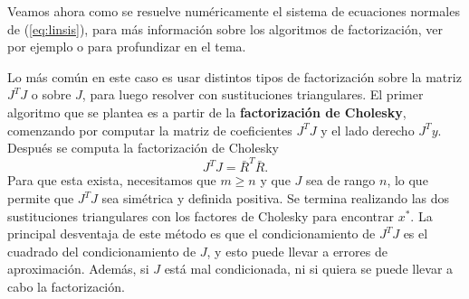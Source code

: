 \documentclass[11pt,a4paper]{book}
\theoremstyle{definition}
\theoremstyle{remark}
\begin{document}
Veamos ahora como se resuelve numéricamente el sistema de ecuaciones normales de (\ref{eq:linsis}), para más información sobre los algoritmos de factorización, ver por ejemplo \cite{Trefethen1997-ek} o \cite{Golub2013-li} para profundizar en el tema.

Lo más común en este caso es usar distintos tipos de factorización sobre la matriz $J^TJ$ o sobre $J$, para luego resolver con sustituciones triangulares.
El primer algoritmo que se plantea es a partir de la \textbf{factorización de Cholesky}, comenzando por computar la matriz de coeficientes $J^TJ$ y el lado derecho $J^Ty$. Después se computa la factorización de Cholesky
\begin{equation}
	J^TJ = \bar R^T\bar R.
\end{equation}
Para que esta exista, necesitamos que $m \geq n$ y que $J$ sea de rango $n$,
lo que permite que $J^TJ$ sea simétrica y definida positiva.
Se termina realizando las dos sustituciones triangulares con los factores de Cholesky para encontrar $x^*$.
La principal desventaja de este método es que el condicionamiento de $J^TJ$ es el cuadrado del condicionamiento de $J$, y esto puede llevar a errores de aproximación.
Además, si $J$ está mal condicionada, ni si quiera se puede llevar a cabo la factorización.
\end{document}
